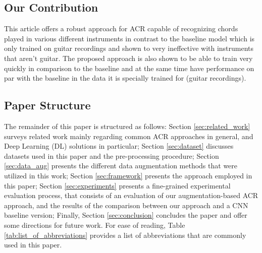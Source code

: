 \documentclass[a4paper]{article}
\begin{document}
\subsection{Our Contribution}
This article offers a robust approach for ACR capable of recognizing chords played in various different instruments in contrast to the baseline model which is only trained on guitar recordings and shown to very ineffective with instruments that aren't guitar. The proposed approach is also shown to be able to train very quickly in comparison to the baseline and at the same time have performance on par with the baseline in the data it is specially trained for (guitar recordings).

\subsection{Paper Structure}
The remainder of this paper is structured as follows: Section \ref{sec:related_work} surveys related work mainly regarding common ACR approaches in general, and Deep Learning (DL) solutions in particular; Section \ref{sec:dataset} discusses datasets used in this paper and the pre-processing procedure; Section \ref{sec:data_aug} presents the different data augmentation methods that were utilized in this work; Section \ref{sec:framework} presents the approach employed in this paper; Section \ref{sec:experiments} presents a fine-grained experimental evaluation process, that consists of an evaluation of our augmentation-based ACR approach, and the results of the comparison between our approach and a CNN baseline version; Finally, Section \ref{sec:conclusion} concludes the paper and offer some directions for future work.
For ease of reading, Table \ref{tab:list_of_abbreviations} provides a list of abbreviations that are commonly used in this paper.
\end{document}
